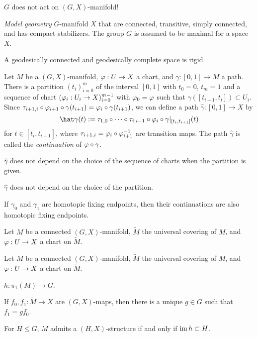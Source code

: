 \documentclass[a4paper]{article}
\begin{document}
$G$ does not act on $(G,X)$-manifold!

\emph{Model geometry}
$G$-manifold $X$ that are connected, transitive, simply connected, and has compact stabilizers.
The group $G$ is assumed to be maximal for a space $X$.


A geodesically connected and geodesically complete space is rigid.


\begin{prb}
Let $M$ be a $(G,X)$-manifold, $\varphi:U\to X$ a chart, and $\gamma:[0,1]\to M$ a path.
There is a partition $(t_i)_{i=0}^m$ of the interval $[0,1]$ with $t_0=0$, $t_m=1$ and a sequence of chart $(\varphi_i:U_i\to X)_{i=0}^{m-1}$ with $\varphi_0=\varphi$ such that $\gamma([t_{i-1},t_i])\subset U_i$.
Since $\tau_{i+1,i}\circ\varphi_{i+1}\circ\gamma(t_{i+1})=\varphi_i\circ\gamma(t_{i+1})$, we can define a path $\hat\gamma:[0,1]\to X$ by
\[\hat\gamma(t):=\tau_{1,0}\circ\cdots\circ\tau_{i,i-1}\circ\f_i\circ\gamma|_{[t_i,t_{i+1}]}(t)\]
for $t\in[t_i,t_{i+1}]$, where $\tau_{i+1,i}=\varphi_i\circ\varphi_{i+1}^{-1}$ are transition maps.
The path $\hat\gamma$ is called the \emph{continuation} of $\varphi\circ\gamma$.
\begin{parts}
\item $\hat\gamma$ does not depend on the choice of the sequence of charts when the partition is given.
\item $\hat\gamma$ does not depend on the choice of the partition.
\item If $\gamma_0$ and $\gamma_1$ are homotopic fixing endpoints, then their continuations are also homotopic fixing endpoints.
\end{parts}
\end{prb}

\begin{prb}
Let $M$ be a connected $(G,X)$-manifold, $\tilde M$ the universal covering of $M$, and $\varphi:U\to X$ a chart on $\tilde M$.
\end{prb}

\begin{prb}[Holonomy]
Let $M$ be a connected $(G,X)$-manifold, $\tilde M$ the universal covering of $M$, and $\varphi:U\to X$ a chart on $\tilde M$.

$h:\pi_1(M)\to G$.
\begin{parts}
\item If $f_0,f_1:\tilde M\to X$ are $(G,X)$-maps, then there is a unique $g\in G$ such that $f_1=gf_0$.
\item For $H\le G$, $M$ admits a $(H,X)$-structure if and only if $\operatorname{im} h\subset H$.
\end{parts}
\end{prb}
\end{document}

